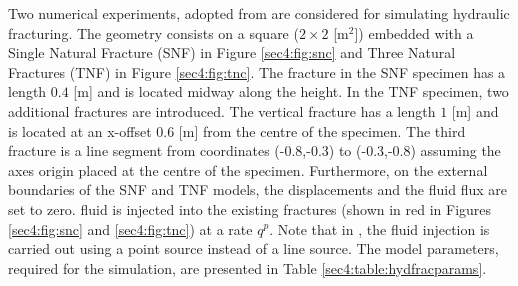 \documentclass[11pt]{article}
\begin{document}
Two numerical experiments, adopted from \cite{Mikelic2015fluidfrac} are considered for simulating hydraulic fracturing. The geometry consists on a square ($2 \times 2$ [m$^2$]) embedded with a Single Natural Fracture (SNF) in Figure \ref{sec4:fig:snc} and Three Natural Fractures (TNF) in Figure \ref{sec4:fig:tnc}. The fracture in the SNF specimen has a length $0.4$ [m] and is located midway along the height. In the TNF specimen, two additional fractures are introduced. The vertical fracture has a length $1$ [m] and is located at an x-offset $0.6$ [m] from the centre of the specimen. The third fracture is a line segment from coordinates (-0.8,-0.3) to (-0.3,-0.8) assuming the axes origin placed at the centre of the specimen. Furthermore, on the external boundaries of the SNF and TNF models, the displacements and the fluid flux are set to zero. fluid is injected into the existing fractures (shown in red in Figures \ref{sec4:fig:snc} and \ref{sec4:fig:tnc}) at a rate $q^p$. Note that in \cite{Mikelic2015fluidfrac}, the fluid injection is carried out using a point source instead of a line source. The model parameters, required for the simulation, are presented in Table \ref{sec4:table:hydfracparams}.
\end{document}
